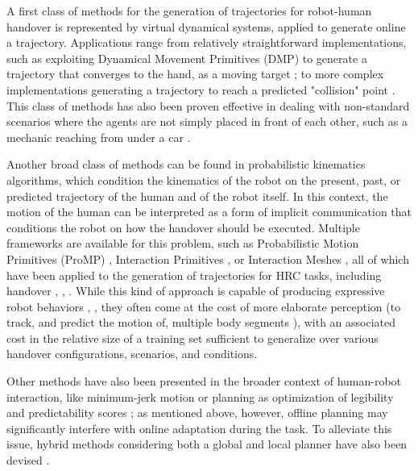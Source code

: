 \documentclass[lettersize,journal]{IEEEtran}
\begin{document}
A first class of methods for the generation of trajectories for robot-human handover is represented by virtual dynamical systems, applied to generate online a trajectory.
Applications range from relatively straightforward implementations, such as exploiting Dynamical Movement Primitives (DMP) to generate a trajectory that converges to the hand, as a moving target \cite{prada_implementation_2014}; to more complex implementations generating a trajectory to reach a predicted "collision" point \cite{medina_human-inspired_2016}.
This class of methods has also been proven effective in dealing with non-standard scenarios where the agents are not simply placed in front of each other, such as a mechanic reaching from under a car \cite{prada_implementation_2014}.

Another broad class of methods can be found in probabilistic kinematics algorithms, which condition the kinematics of the robot on the present, past, or predicted trajectory of the human and of the robot itself.
In this context, the motion of the human can be interpreted as a form of implicit communication that conditions the robot on how the handover should be executed.
Multiple frameworks are available for this problem, such as Probabilistic Motion Primitives (ProMP) \cite{paraschos_probabilistic_2013}, Interaction Primitives \cite{ben_amor_interaction_2014}, or Interaction Meshes \cite{ho_spatial_2010}, all of which have been applied to the generation of trajectories for HRC tasks, including handover \cite{maeda_probabilistic_2017}, \cite{ben_amor_interaction_2014}, \cite{vogt_system_2017}.
While this kind of approach is capable of producing expressive robot behaviors \cite{maeda_probabilistic_2017}, \cite{ben_amor_interaction_2014}, they often come at the cost of more elaborate perception (to track, and predict the motion of, multiple body segments \cite{ben_amor_interaction_2014}), with an associated cost in the relative size of a training set sufficient to generalize over various handover configurations, scenarios, and conditions.

Other methods have also been presented in the broader context of human-robot interaction, like minimum-jerk motion \cite{huber_human-robot_2008} or planning as optimization of legibility and predictability scores \cite{dragan_effects_2015}; as mentioned above, however, offline planning may significantly interfere with online adaptation during the task.
To alleviate this issue, hybrid methods considering both a global and local planner have also been devised \cite{marturi_dynamic_2019}.
\end{document}
